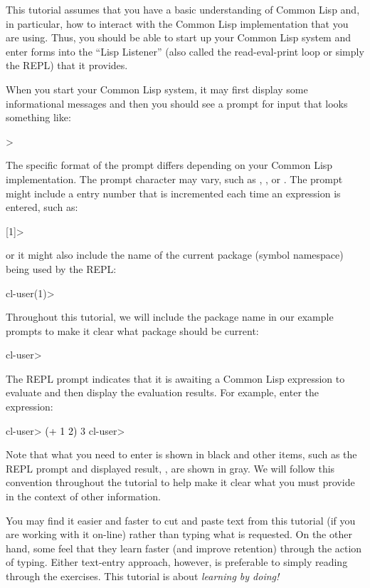 \documentclass[10pt,twoside,english,pdftex]{article}
\begin{document}
%
This tutorial assumes that you have a basic understanding of Common Lisp and,
in particular, how to interact with the Common Lisp implementation that you
are using.  Thus, you should be able to start up your Common Lisp system and
enter forms into the ``Lisp Listener'' (also called the read-eval-print loop
or simply the REPL) that it provides.  

When you start your Common Lisp system, it may first display some informational
messages and then you should see a prompt for input that looks something like:
%
\W\supp
\begin{example}
\textcolor{darkergray}{%
  >}
\end{example}
%
The specific format of the prompt differs depending on your Common Lisp
implementation.  The prompt character may vary, such as \code{*}, \code{:}, or
.  The prompt might include a entry number that is incremented each
time an expression is entered, such as:
%
\W\supp\notpretop
\begin{example}
\textcolor{darkergray}{%
  [1]>}
\end{example}
%
or it might also include the name of the current package (symbol namespace)
being used by the REPL:
%
\W\supp\notpretop
\begin{example}
\textcolor{darkergray}{%
  cl-user(1)>}
\end{example}

Throughout this tutorial, we will include the package name in our
example prompts to make it clear what package should be current:
%
\W\supp
\begin{example}%
\textcolor{darkergray}{%
  cl-user>}
\end{example}
%
The REPL prompt indicates that it is awaiting a Common Lisp expression to
evaluate and then display the evaluation results. For example, enter the
expression:
%
\W\supp\notpretop
\begin{example}
\textcolor{darkergray}{%
  cl-user> \textcolor{black}{(+ 1 2)}
  3
  cl-user>}
\end{example}
%
Note that what you need to enter is shown in black and other items, such as
the REPL prompt and displayed result, , are shown in gray.  We will
follow this convention throughout the tutorial to help make it clear what you
must provide in the context of other information.

You may find it easier and faster to cut and paste text from this tutorial (if
you are working with it on-line) rather than typing what is requested.  On the
other hand, some feel that they learn faster (and improve retention) through
the action of typing.  Either text-entry approach, however, is preferable to
simply reading through the exercises.  This tutorial is about \textit{learning by doing!}
\end{document}

